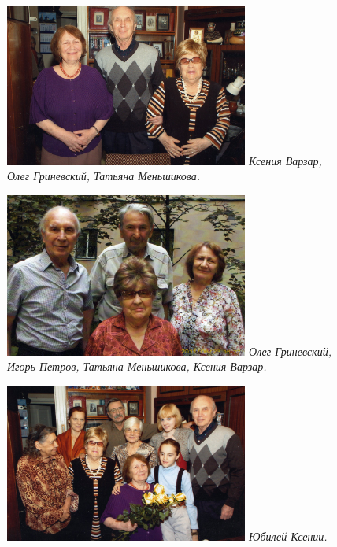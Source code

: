 \vspace{-5pt}
\begin{figure}[h!]
    \begin{minipage}{80mm}
    \includegraphics[width=80mm]{inc/19/1}
    \textit{\footnotesize{Ксения Варзар, Олег Гриневский, Татьяна Меньшикова.}}
    \end{minipage}
\end{figure}
\vfill
\begin{figure}[h!]
    \begin{minipage}{80mm}
    \includegraphics[width=80mm]{inc/19/2}
    \textit{\footnotesize{Олег Гриневский, Игорь Петров, Татьяна Меньшикова, Ксения Варзар.}}
    \end{minipage}
\end{figure}
\vfill
\begin{figure}[h!]
    \begin{minipage}{80mm}
    \includegraphics[width=80mm]{inc/19/3}
    \textit{\footnotesize{Юбилей Ксении.}}
    \end{minipage}
\end{figure}


